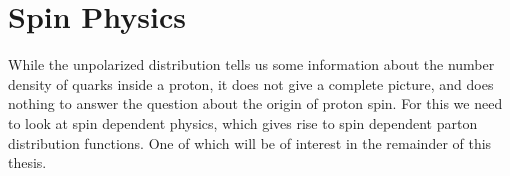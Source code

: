 \documentclass[abstract = on,listof=totoc, bibliography=totoc]{scrreprt}
\begin{document}
%

\chapter{Spin Physics}
While the unpolarized distribution tells us some information about the number density of quarks inside a proton, it does not give a complete picture, and does nothing to answer the question about the origin of proton spin. For this we need to look at spin dependent physics, which gives rise to spin dependent parton distribution functions. One of which will be of interest in the remainder of this thesis. 
\end{document}
